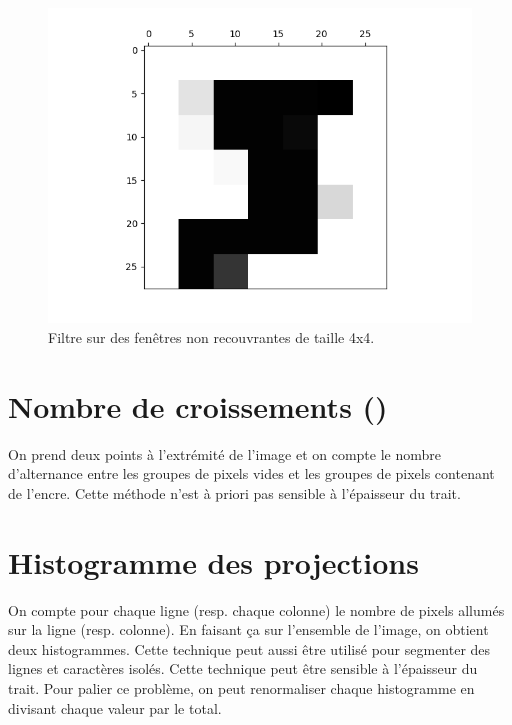 \begin{figure}
  \centering
  \includegraphics[scale=0.4]{assets/zoning-training-0-max}
  \caption{Filtre  sur des fenêtres non recouvrantes de taille 4x4.}
  \label{fig:zoning-max}
\end{figure}




\section{Nombre de croissements ()}



On prend deux points à l’extrémité de l’image et on compte le nombre d’alternance 
entre les groupes de pixels vides et les groupes de pixels contenant de l’encre. 
Cette méthode n’est à priori pas sensible à l’épaisseur du trait.



\section{Histogramme des projections}



On compte pour chaque ligne (resp. chaque colonne) le nombre de pixels allumés sur 
la ligne (resp. colonne). 
En faisant ça sur l’ensemble de l’image, on obtient deux histogrammes. 
Cette technique peut aussi être utilisé pour segmenter des lignes et caractères isolés. 
Cette technique peut être sensible à l’épaisseur du trait. 
Pour palier ce problème, on peut renormaliser chaque histogramme en divisant 
chaque valeur par le total.

